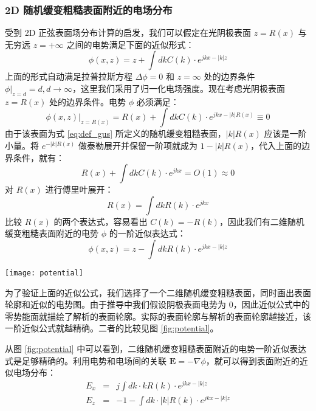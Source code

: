 \subsubsection{2D 随机缓变粗糙表面附近的电场分布}
受到 2D 正弦表面场分布计算的启发，我们可以假定在光阴极表面 $z = R(x)$ 与无穷远 $z = +\infty$ 之间的电势满足下面的近似形式：
\[
\phi(x, z) = z + \int dkC(k)\cdot e^{jkx-|k|z}
\]
上面的形式自动满足拉普拉斯方程 $\Delta\phi = 0$ 和 $z=\infty$ 处的边界条件 $\phi|_{z=d}=d, d\to\infty$，这里我们采用了归一化电场强度。现在考虑光阴极表面 $z=R(x)$ 处的边界条件。电势 $\phi$ 必须满足：
\[
\phi(x, z)\big|_{z=R(x)} = R(x) + \int dkC(k)\cdot e^{jkx-|k|R(x)} \equiv 0
\]
由于该表面为式 \ref{eq:def_gus} 所定义的随机缓变粗糙表面，$|k|R(x)$ 应该是一阶小量。将 $e^{-|k|R(x)}$ 做泰勒展开并保留一阶项就成为 $1-|k|R(x)$，代入上面的边界条件，就有：
\[
R(x) + \int dkC(k)\cdot e^{jkx} = O(1) \approx 0
\]
对 $R(x)$ 进行傅里叶展开：
\[
R(x) = \int dkR(k)\cdot e^{jkx}
\]
比较 $R(x)$ 的两个表达式，容易看出 $C(k) = -R(k)$，因此我们有二维随机缓变粗糙表面附近的电势 $\phi$ 的一阶近似表达式：
\begin{equation}
\label{eq:2d-pot}
\phi(x, z) = z - \int dkR(k)\cdot e^{jkx-|k|z}
\end{equation}

\begin{figure*}[htbp]
\texttt{[image: potential]}
\caption{\label{fig:potential} 
验证电势一阶近似表达式的精确度。采用图 \ref{fig:conf} 所示的真实光阴极表面的沿 $x=57.47\,\mu\text{m}$ 的一个纵截面，该截面阴极表面轮廓用黑色实现描出；图中的白色实线为式 \ref{eq:2d-pot} 给出的解析公式的零势能面（对于 2D 情形而言是一条曲线），从图中可见看到，阴极表面轮廓和解析的零势能面几乎完全重合，这就验证了电势一阶近似表达式的精确性。}
\end{figure*}

为了验证上面的近似公式，我们选择了一个二维随机缓变粗糙表面，同时画出表面轮廓和近似的电势图。由于推导中我们假设阴极表面电势为 0，因此近似公式中的零势能面就描绘了解析的表面轮廓。实际的表面轮廓与解析的表面轮廓越接近，该一阶近似公式就越精确。二者的比较见图 \ref{fig:potential}。

从图 \ref{fig:potential} 中可以看到，二维随机缓变粗糙表面附近的电势一阶近似表达式是足够精确的。利用电势和电场间的关联 $\bm{E}=-\nabla\phi$，就可以得到表面附近的近似电场分布：
\begin{eqnarray*}
E_x &=& j\int dk\cdot kR(k)\cdot e^{jkx-|k|z} \\
E_z &=& -1-\int dk\cdot |k|R(k)\cdot e^{jkx-|k|z}
\end{eqnarray*}


